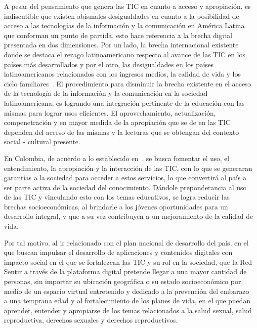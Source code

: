 \documentclass[journal,transmag]{IEEEtran}
\begin{document}
A pesar del pensamiento que genera las TIC en cuanto a acceso y apropiación, es indiscutible que existen abismales desigualdades en cuanto a la posibilidad de acceso a las tecnologías de la información y la comunicación en América Latina que conforman un punto de partida, esto hace referencia a la brecha digital presentada en dos dimensiones. Por un lado, la brecha internacional existente donde se destaca el rezago latinoamericano respecto al avance de las TIC en los países más desarrollados y por el otro, las desigualdades en los países latinoamericanos relacionados con los ingresos medios, la calidad de vida y los ciclo familiares~\cite{Sunkel2006}. El procedimiento para disminuir la brecha existente en el acceso de la tecnología de la información y la comunicación en la sociedad latinoamericana, es logrando una integración pertinente de la educación con las mismas para lograr usos eficientes. El aprovechamiento, actualización, compenetración y en mayor medida de la apropiación que se de en las TIC dependen del acceso de las mismas y la lecturas que se obtengan del contexto social - cultural presente.

En Colombia, de acuerdo a lo establecido en~\cite{Plan2014}, se busca fomentar el uso, el entendimiento, la apropiación y la interacción de las TIC, con lo que se generaran garantías a la sociedad para acceder a estos servicios, lo que convertirá al país a ser parte activa de la sociedad del conocimiento. Dándole preponderancia al uso de las TIC y vinculando esto con los temas educativos, se logra reducir las brechas socioeconómicas, al brindarle a los jóvenes oportunidades para un desarrollo integral, y que a su vez contribuyen a un mejoramiento de la calidad de vida.

Por tal motivo, al ir relacionado con el plan nacional de desarrollo del país, en el que buscan impulsar el desarrollo de aplicaciones y contenidos digitales con impacto social en el que se fortalezcan las TIC y su rol en la sociedad, que la Red Sentir a través de la plataforma digital pretende llegar a una mayor cantidad de personas, sin importar su ubicación geográfica o su estado socioeconómico por medio de un espacio virtual entretenido y dedicado a la prevención del embarazo a una temprana edad y al fortalecimiento de los planes de vida, en el que puedan aprender, entender y apropiarse de los temas relacionados a la salud sexual, salud reproductiva, derechos sexuales y derechos reproductivos.
\end{document}
